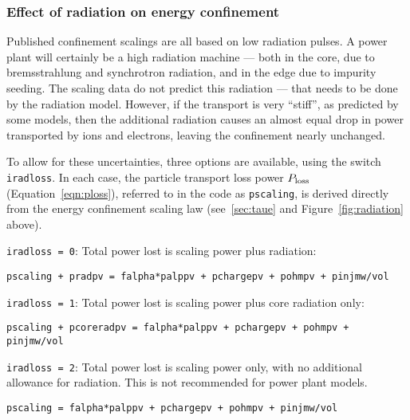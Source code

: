\documentclass[11pt,a4paper]{report}
\begin{document}
\subsubsection*{Effect of radiation on energy confinement}
\label{sec:iradloss}

Published confinement scalings are all based on low radiation pulses. A power
plant will certainly be a high radiation machine --- both in the core, due to
bremsstrahlung and synchrotron radiation, and in the edge due to impurity
seeding. The scaling data do not predict this radiation --- that needs to be
done by the radiation model. However, if the transport is very ``stiff'', as
predicted by some models, then the additional radiation causes an almost equal
drop in power transported by ions and electrons, leaving the confinement
nearly unchanged.

To allow for these uncertainties, three options are available, using the
switch \texttt{iradloss}. In each case, the particle transport loss power $P_{\mbox{\scriptsize loss}}$ (Equation~\ref{eqn:ploss}), referred to in the code as \texttt{pscaling}, is
derived directly from the energy confinement scaling law (see~\ref{sec:taue} and Figure~\ref{fig:radiation} above).

\begin{description}

\item{\texttt{iradloss = 0}:}  Total power lost is scaling power plus
  radiation:
\begin{verbatim}
pscaling + pradpv = falpha*palppv + pchargepv + pohmpv + pinjmw/vol
\end{verbatim}

\item{\texttt{iradloss = 1}:}  Total power lost is scaling power plus core
  radiation only:
\begin{verbatim}
pscaling + pcoreradpv = falpha*palppv + pchargepv + pohmpv + pinjmw/vol
\end{verbatim}

\item{\texttt{iradloss = 2}:}  Total power lost is scaling power only, with no
  additional allowance for radiation. This is not recommended for power plant
  models.
\begin{verbatim}
pscaling = falpha*palppv + pchargepv + pohmpv + pinjmw/vol
\end{verbatim}

\end{description}
\end{document}
